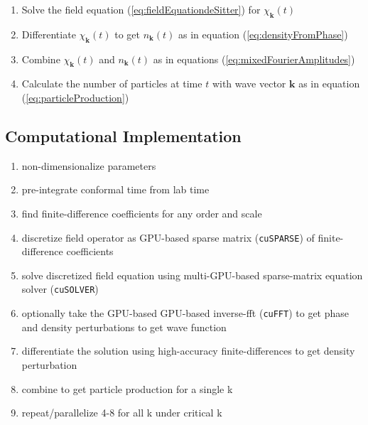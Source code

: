 \documentclass{article}
\begin{document}
            \begin{enumerate}
                \item Solve the field equation (\ref{eq:fieldEquationdeSitter}) for $\chi_\mathbf{k}(t)$
                \item Differentiate $\chi_\mathbf{k}(t)$ to get $n_\mathbf{k}(t)$ as in equation (\ref{eq:densityFromPhase})
                \item Combine $\chi_\mathbf{k}(t)$ and $n_\mathbf{k}(t)$ as in equations (\ref{eq:mixedFourierAmplitudes})
                \item Calculate the number of particles at time $t$ with wave vector $\mathbf{k}$ as in equation (\ref{eq:particleProduction})
            \end{enumerate}

    \subsection{Computational Implementation}

        \begin{enumerate}
            \item non-dimensionalize parameters
            \item pre-integrate conformal time from lab time
            \item find finite-difference coefficients for any order and scale
            \item discretize field operator as GPU-based sparse matrix (\verb|cuSPARSE|) of finite-difference coefficients
            \item solve discretized field equation using multi-GPU-based sparse-matrix equation solver (\verb|cuSOLVER|)
            \item optionally take the GPU-based GPU-based inverse-fft (\verb|cuFFT|) to get phase and density perturbations to get wave function
            \item differentiate the solution using high-accuracy finite-differences to get density perturbation
            \item combine to get particle production for a single k
            \item repeat/parallelize 4-8 for all k under critical k
        \end{enumerate}

\end{document}
